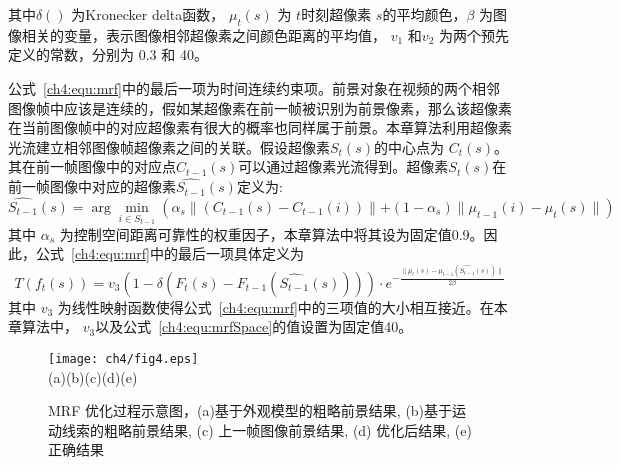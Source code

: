 其中$\delta()$ 为Kronecker delta函数， $\mu_{t}(s)$ 为 $t$时刻超像素 $s$的平均颜色，$\beta$ 为图像相关的变量，表示图像相邻超像素之间颜色距离的平均值， $v_{1}$ 和$v_{2}$ 为两个预先定义的常数，分别为 0.3 和 40。\par
公式~\ref{ch4:equ:mrf}中的最后一项为时间连续约束项。前景对象在视频的两个相邻图像帧中应该是连续的，假如某超像素在前一帧被识别为前景像素，那么该超像素在当前图像帧中的对应超像素有很大的概率也同样属于前景。本章算法利用超像素光流建立相邻图像帧超像素之间的关联。假设超像素$S_{t}(s)$的中心点为 $C_{t}(s)$。其在前一帧图像中的对应点$C_{t-1}(s)$可以通过超像素光流得到。超像素$S_{t}(s)$在前一帧图像中对应的超像素$\hat{S_{t-1}}(s)$定义为:
$$ \hat{S_{t-1}}(s) = \arg\min_{i\in S_{t-1}}(\alpha_{s}\parallel (C_{t-1}(s) - C_{t-1}(i))\parallel + (1-\alpha_{s})\parallel \mu_{t-1}(i) - \mu_{t}(s)\parallel) $$
其中 $\alpha_{s} $ 为控制空间距离可靠性的权重因子，本章算法中将其设为固定值0.9。因此，公式~\ref{ch4:equ:mrf}中的最后一项具体定义为
$$ T(f_{t}(s)) = v_{3}(1-\delta(F_{t}(s)-F_{t-1}(\hat{S_{t-1}}(s))))\cdot e^{-\frac {\parallel \mu_{t}(s) -\mu_{t-1}(\hat{S_{t-1}}(s)) \parallel}{2\beta}}$$
其中 $v_{3}$ 为线性映射函数使得公式~\ref{ch4:equ:mrf}中的三项值的大小相互接近。在本章算法中， $v_{3}$以及公式~\ref{ch4:equ:mrfSpace}的值设置为固定值40。\par



\begin{figure}[htbp]
\begin{center}
   \texttt{[image: ch4/fig4.eps]}\\
(a)\quad\quad\quad\quad\quad\quad(b)\quad\quad\quad\quad\quad\quad(c)\quad\quad\quad\quad\quad\quad(d)\quad\quad\quad\quad\quad\quad(e)
\end{center}

\caption{MRF 优化过程示意图，(a)基于外观模型的粗略前景结果, (b)基于运动线索的粗略前景结果, (c) 上一帧图像前景结果, (d) 优化后结果, (e) 正确结果}
\label{ch4:fig:mrf}       %
\end{figure}

